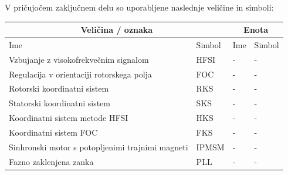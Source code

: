 \documentclass[a4paper,twoside,openright,12pt,slovene]{book}
\begin{document}

\tableofcontents

\seznamslik

\seznamsimbolov
V pričujočem zaključnem delu so uporabljene naslednje veličine in simboli:

\begin{center}
    \begin{tabular}{*{4}{l}} \hline
        \multicolumn{2}{c}{\bf{Veličina / oznaka}}           & \multicolumn{2}{c}{\bf{Enota}} \\ \hline
        Ime                                                        & Simbol                                 & Ime                  & Simbol                 \\ \hline
        Vzbujanje z visokofrekvečnim signalom                      & HFSI                                   & -                    & -                      \\
        Regulacija v orientaciji rotorskega polja                  & FOC                                    & -                    & -                      \\
        Rotorski koordinatni sistem                                & RKS                                    & -                    & -                      \\
        Statorski koordinatni sistem                               & SKS                                    & -                    & -                      \\
        Koordinatni sistem metode HFSI                             & HKS                                    & -                    & -                      \\
        Koordinatni sistem FOC                                     & FKS                                    & -                    & -                      \\
        Sinhronski motor s potopljenimi trajnimi magneti           & IPMSM                                  & -                    & -                      \\
        Fazno zaklenjena zanka                                     & PLL                                    & -                    & -                      \\

\end{tabular}
\end{center}
\end{document}
